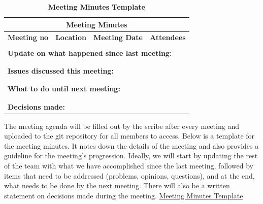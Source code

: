 \documentclass{article}
\begin{document}
\begin{table}[bp]
\caption{\bf Meeting Minutes Template} \label{TblMeetMin}
\begin{tabularx}{\textwidth}{ |X||X||X||X| }
    \hline
    \hline
        \multicolumn{4}{|c|}{\textbf{Meeting Minutes}} \\ 
    \hline
    \hline

    \textbf{Meeting no} & \textbf{Location} & \textbf{Meeting Date} & \textbf{Attendees}\\
    \hline
	
	 & & & \\

    \hline

    \multicolumn{4}{|l|}{\textbf{Update on what happened since last meeting: }} \\
		
    \multicolumn{4}{|l|}{ }\\
    \multicolumn{4}{|l|}{ }\\

    \hline
    
    \multicolumn{4}{|l|}{\textbf{Issues discussed this meeting: }}\\

    \multicolumn{4}{|l|}{ }\\
    \multicolumn{4}{|l|}{ }\\ 

    \hline

    \multicolumn{4}{|l|}{\textbf{What to do until next meeting: }} \\

    \multicolumn{4}{|l|}{ }\\
    \multicolumn{4}{|l|}{ }\\

    \hline
        \multicolumn{4}{|l|}{\textbf{Decisions made: }} \\
    \hline
\end{tabularx}
\end{table}


The meeting agenda will be filled out by the scribe after every meeting and uploaded to the git repository for all members to access. Below is a template for the meeting minutes. It notes down the details of the meeting and also provides a guideline for the meeting’s progression. Ideally, we will start by updating the rest of the team with what we have accomplished since the last meeting, followed by items that need to be addressed (problems, opinions, questions), and at the end, what needs to be done by the next meeting. There will also be a written statement on decisions made during the meeting. \hyperref[TblMeetMin]{Meeting Minutes Template}
\end{document}
